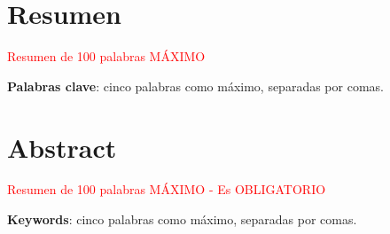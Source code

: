 \chapter{Resumen}
\textcolor{red}{Resumen de 100 palabras MÁXIMO}\\

\vspace{0.5cm}

\textbf{Palabras clave}: cinco palabras como máximo, separadas por comas.

\newpage
\thispagestyle{empty}
\hspace*{0.5cm}
\newpage

\chapter{Abstract}
\textcolor{red}{Resumen de 100 palabras MÁXIMO - Es OBLIGATORIO}\\

\vspace{0.5cm}

\textbf{Keywords}: cinco palabras como máximo, separadas por comas.
\newpage
\thispagestyle{empty}
\hspace*{0.5cm}
\newpage